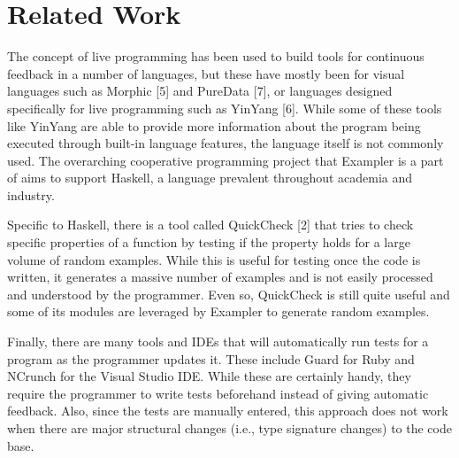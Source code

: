 \section{Related Work}

The concept of live programming has been used to build tools for continuous feedback in a number of languages, but these have mostly been for visual languages such as Morphic [5] and PureData [7], or languages designed specifically for live programming such as YinYang [6].
While some of these tools like YinYang are able to provide more information about the program being executed through built-in language features, the language itself is not commonly used.
The overarching cooperative programming project that Exampler is a part of aims to support Haskell, a language prevalent throughout academia and industry.

Specific to Haskell, there is a tool called QuickCheck [2] that tries to check specific properties of a function by testing if the property holds for a large volume of random examples.
While this is useful for testing once the code is written, it generates a massive number of examples and is not easily processed and understood by the programmer.
Even so, QuickCheck is still quite useful and some of its modules are leveraged by Exampler to generate random examples.

Finally, there are many tools and IDEs that will automatically run tests for a program as the programmer updates it.
These include Guard for Ruby and NCrunch for the Visual Studio IDE.
While these are certainly handy, they require the programmer to write tests beforehand instead of giving automatic feedback.
Also, since the tests are manually entered, this approach does not work when there are major structural changes (i.e., type signature changes) to the code base.



